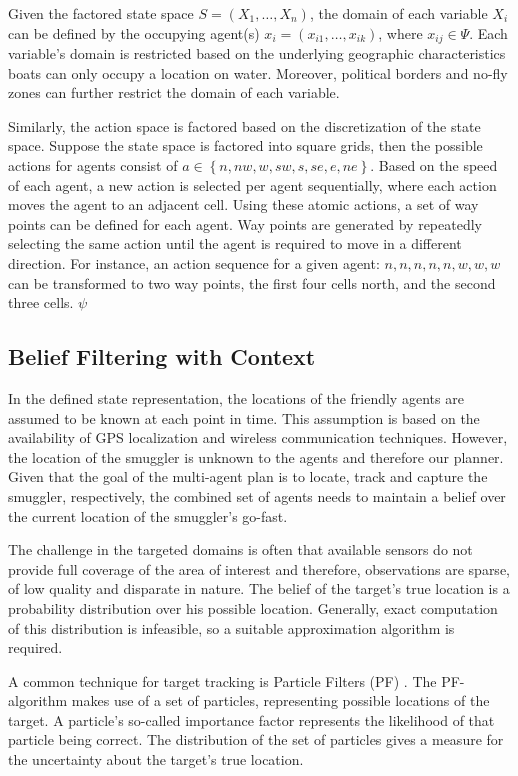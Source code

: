 \documentclass[conference]{IEEEtran}
\begin{document}
Given the factored state space $S = \left(X_1,\ldots,X_n\right)$, the domain of each variable $X_i$ can be defined by the occupying agent(s) \ie $x_i=\left(x_{i1},\ldots,x_{ik}\right)$, where $x_{ij}\in\Psi$. Each variable's domain is restricted based on the underlying geographic characteristics \ie boats can only occupy a location on water. Moreover, political borders and no-fly zones can further restrict the domain of each variable.

Similarly, the action space is factored based on the discretization of the state space. Suppose the state space is factored into square grids, then the possible actions for agents consist of $a\in\left\{n, nw, w, sw, s, se, e, ne\right\}$. Based on the speed of each agent, a new action is selected per agent sequentially, where each action moves the agent to an adjacent cell. Using these atomic actions, a set of way points can be defined for each agent. Way points are generated by repeatedly selecting the same action until the agent is required to move in a different direction. For instance, an action sequence for a given agent: $n, n, n, n, n, w, w, w$ can be transformed to two way points, the first four cells north, and the second three cells.  $\psi$

\subsection{Belief Filtering with Context}
\label{subsec:belief-filter}

In the defined state representation, the locations of the friendly agents are assumed to be known at each point in time. This assumption is based on the availability of GPS localization and wireless communication techniques. However, the location of the smuggler is unknown to the agents and therefore our planner. Given that the goal of the multi-agent plan is to locate, track and capture the smuggler, respectively, the combined set of agents needs to maintain a belief over the current location of the smuggler's go-fast.

The challenge in the targeted domains is often that available sensors do not provide full coverage of the area of interest and therefore, observations are sparse, of low quality and disparate in nature. The belief of the target's true location is a probability distribution over his possible location. Generally, exact computation of this distribution is infeasible, so a suitable approximation algorithm is required.

A common technique for target tracking is Particle Filters (PF) \cite{Blackman1999}. The PF-algorithm makes use of a set of particles, representing possible locations of the target. A particle's so-called importance factor represents the likelihood of that particle being correct. The distribution of the set of particles gives a measure for the uncertainty about the target's true location.
\end{document}
